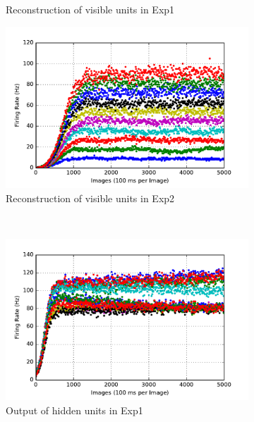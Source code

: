 \begin{figure}
\begin{subfigure}[t]{0.4\textwidth}
		\caption{Reconstruction of visible units in Exp1}
	\end{subfigure}
	\begin{subfigure}[t]{0.4\textwidth}
		\includegraphics[width=\textwidth]{pics_sdlm/03_exp_SAE_noise_long/exp2_recon_s.pdf}
		\caption{Reconstruction of visible units in Exp2}
	\end{subfigure}\\
	\begin{subfigure}[t]{0.4\textwidth}
		\includegraphics[width=\textwidth]{pics_sdlm/03_exp_SAE_noise_long/exp1_hid_s.pdf}
		\caption{Output of hidden units in Exp1}
	\end{subfigure}
	\begin{subfigure}[t]{0.4\textwidth}

\end{subfigure}
\end{figure}
